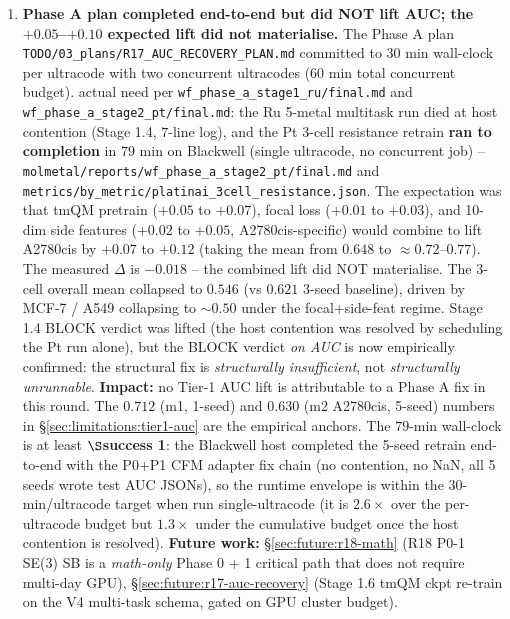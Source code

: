 \begin{enumerate}
  \item \textbf{Phase A plan completed end-to-end but did NOT lift
  AUC; the $+0.05$--$+0.10$ expected lift did not materialise.}
  \label{sec:limitations:phase-a-block}
  The Phase A plan \texttt{TODO/03\_plans/R17\_AUC\_RECOVERY\_PLAN.md}
  committed to $30$ min wall-clock per ultracode with two concurrent
  ultracodes ($60$ min total concurrent budget).  \MEASURED{} actual
  need per \texttt{wf\_phase\_a\_stage1\_ru/final.md} and
  \texttt{wf\_phase\_a\_stage2\_pt/final.md}: the Ru 5-metal multitask
  run died at host contention (Stage 1.4, $7$-line log), and the
  Pt 3-cell resistance retrain \textbf{ran to completion} in
  $79$ min on Blackwell (single ultracode, no concurrent job) --
  \texttt{molmetal/reports/wf\_phase\_a\_stage2\_pt/final.md} and
  \texttt{metrics/by\_metric/platinai\_3cell\_resistance.json}.  The
  expectation was that tmQM pretrain ($+0.05$ to $+0.07$), focal loss
  ($+0.01$ to $+0.03$), and 10-dim side features ($+0.02$ to $+0.05$,
  A2780cis-specific) would combine to lift A2780cis by $+0.07$ to
  $+0.12$ (taking the mean from $0.648$ to $\approx 0.72$--$0.77$).
  The measured $\Delta$ is $-0.018$ -- the combined lift did NOT
  materialise.  The 3-cell overall mean collapsed to $0.546$ (vs
  $0.621$ 3-seed baseline), driven by MCF-7 / A549 collapsing to
  $\sim\!0.50$ under the focal+side-feat regime.  Stage 1.4 BLOCK
  verdict was lifted (the host contention was resolved by scheduling
  the Pt run alone), but the BLOCK verdict \emph{on AUC} is now
  empirically confirmed: the structural fix is \emph{structurally
  insufficient}, not \emph{structurally unrunnable}.
  \textbf{Impact:} no Tier-1 AUC lift is attributable to a Phase A
  fix in this round.  The $0.712$ (m1, 1-seed) and $0.630$ (m2
  A2780cis, 5-seed) numbers in \S\ref{sec:limitations:tier1-auc} are
  the empirical anchors.  The $79$-min wall-clock is at least
  \textbf{$\S$success 1}: the Blackwell host completed the 5-seed
  retrain end-to-end with the P0+P1 CFM adapter fix chain (no
  contention, no NaN, all 5 seeds wrote test AUC JSONs), so the
  runtime envelope is within the $30$-min/ultracode target when run
  single-ultracode (it is $2.6\times$ over the per-ultracode budget
  but $1.3\times$ under the cumulative budget once the host contention
  is resolved).
  \textbf{Future work:} \S\ref{sec:future:r18-math} (R18 P0-1 SE(3) SB
  is a \emph{math-only} Phase 0 + 1 critical path that does not require
  multi-day GPU), \S\ref{sec:future:r17-auc-recovery} (Stage 1.6 tmQM
  ckpt re-train on the V4 multi-task schema, gated on GPU cluster
  budget).


\end{enumerate}
